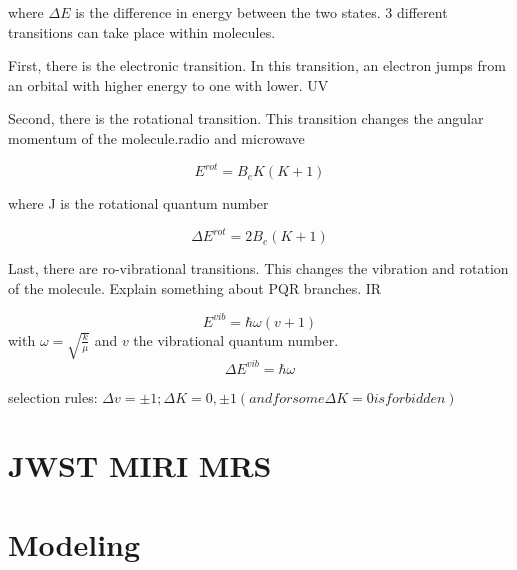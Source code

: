 \documentclass[twoside, single, authoryear, semicolon]{lion-msc}
\newcommand{\4}{$_4$}
\newcommand{\3}{$_3$}
\newcommand{\2}{$_2$}
\begin{document}
where $\Delta E$ is the difference in energy between the two states. 3 different transitions can take place within molecules. 

First, there is the electronic transition. In this transition, an electron jumps from an orbital with higher energy to one with lower. UV 

Second, there is the rotational transition. This transition changes the angular momentum of the molecule.radio and microwave

\begin{equation}
    E^{rot}=B_eK(K+1)
\end{equation}

where J is the rotational quantum number

\begin{equation}
    \Delta  E^{rot}=2B_e(K+1)
\end{equation}

Last, there are ro-vibrational transitions. This changes the vibration and rotation of the molecule. Explain something about PQR branches. IR

\begin{equation}
    E^{vib}=\hbar\omega(v+1)
\end{equation}
with $\omega=\sqrt{\frac{k}{\mu}}$ and $v$ the vibrational quantum number.
\begin{equation}
    \Delta E^{vib}=\hbar\omega
\end{equation}

selection rules:
$\Delta v=\pm 1; \Delta K = 0, \pm1 (and for some \Delta K=0 is forbidden)$

\section{JWST MIRI MRS}


\section{Modeling}
\end{document}
